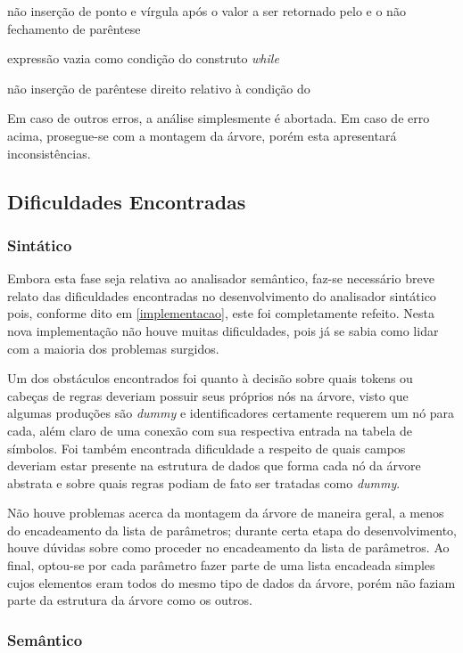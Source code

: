 \documentclass[
	article,			%
	11pt,				%
	oneside,			%
	a4paper,			%
	english,			%
	brazil,				%
	sumario=tradicional
	]{abntex2}
\renewcommand{\it}[1]{\textit{#1}}
\begin{document}
\begin{itemize}{
		\item não inserção de ponto e vírgula após o valor a ser retornado pelo  e o não fechamento de parêntese 
		\item expressão vazia como condição do construto \it{while}
		\item não inserção de parêntese direito relativo à condição do 
	}
\end{itemize}
Em caso de outros erros, a análise simplesmente é abortada. Em caso de erro acima, prosegue-se com a montagem da árvore, porém esta apresentará inconsistências.

\subsection {Dificuldades Encontradas}

\subsubsection{Sintático}
\label{difSintatico}
Embora esta fase seja relativa ao analisador semântico, faz-se necessário breve relato das dificuldades encontradas no desenvolvimento do analisador sintático pois, conforme dito em \ref{implementacao},
este foi completamente refeito. Nesta nova implementação não houve muitas dificuldades, pois já se sabia como lidar com a maioria dos problemas surgidos.

Um dos obstáculos encontrados foi quanto à decisão sobre quais tokens ou cabeças de regras deveriam possuir seus próprios nós na árvore, visto que algumas produções são \it{dummy} e identificadores certamente requerem um nó para cada, além claro de uma conexão com sua respectiva entrada na tabela de símbolos. Foi
também encontrada dificuldade a respeito de quais campos deveriam estar presente na estrutura de dados que forma cada nó da árvore abstrata e sobre quais regras podiam de fato ser tratadas como \it{dummy}.

Não houve problemas acerca da montagem da árvore de maneira geral, a menos do encadeamento da lista de parâmetros; durante certa etapa do desenvolvimento, houve dúvidas sobre como proceder no encadeamento da lista de parâmetros. Ao final, optou-se por cada parâmetro fazer parte de uma lista encadeada simples cujos elementos eram todos do mesmo tipo de dados da árvore, porém não faziam parte da estrutura da árvore como os outros.

\subsubsection{Semântico}
\label{semantico}
\end{document}
